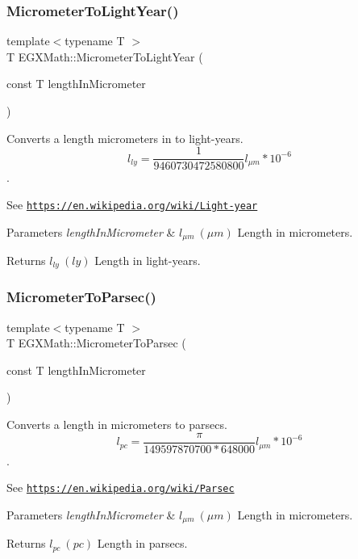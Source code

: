 \subsubsection{\texorpdfstring{Micrometer\+To\+Light\+Year()}{MicrometerToLightYear()}}
{\footnotesize\ttfamily template$<$typename T $>$ \\
T E\+G\+X\+Math\+::\+Micrometer\+To\+Light\+Year (\begin{DoxyParamCaption}\item[{const T}]{length\+In\+Micrometer }\end{DoxyParamCaption})}



Converts a length micrometers in to light-\/years. \[ l_{ly}= \frac{1}{9460730472580800} l_{\mu m} * 10^{-6} \]. 

See \href{https://en.wikipedia.org/wiki/Light-year}{\tt https\+://en.\+wikipedia.\+org/wiki/\+Light-\/year} 
\begin{DoxyParams}{Parameters}
{\em length\+In\+Micrometer} & $ l_{\mu m}\ (\mu m)$ Length in micrometers. \\
\hline
\end{DoxyParams}
\begin{DoxyReturn}{Returns}
$ l_{ly}\ (ly)$ Length in light-\/years. 
\end{DoxyReturn}
\mbox{\label{group___e_g_x_math-_conversions-_length_conversions-_s_i-_micrometer-_astronomical_gab7d1e9a1568a8691855121c9cf2b38f5}} 
\subsubsection{\texorpdfstring{Micrometer\+To\+Parsec()}{MicrometerToParsec()}}
{\footnotesize\ttfamily template$<$typename T $>$ \\
T E\+G\+X\+Math\+::\+Micrometer\+To\+Parsec (\begin{DoxyParamCaption}\item[{const T}]{length\+In\+Micrometer }\end{DoxyParamCaption})}



Converts a length in micrometers to parsecs. \[ l_{pc}=\frac{\pi}{149597870700 * 648000} l_{\mu m} * 10^{-6} \]. 

See \href{https://en.wikipedia.org/wiki/Parsec}{\tt https\+://en.\+wikipedia.\+org/wiki/\+Parsec} 
\begin{DoxyParams}{Parameters}
{\em length\+In\+Micrometer} & $ l_{\mu m}\ (\mu m)$ Length in micrometers. \\
\hline
\end{DoxyParams}
\begin{DoxyReturn}{Returns}
$ l_{pc}\ (pc)$ Length in parsecs. 
\end{DoxyReturn}
